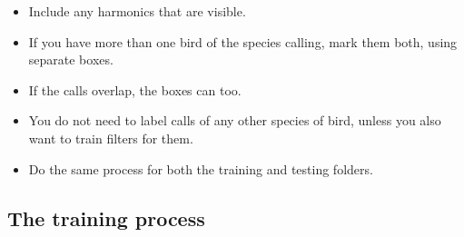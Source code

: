 \documentclass{article}
\begin{document}
\begin{description}
\begin{itemize}
\item Include any harmonics that are visible. 
\item If you have more than one bird of the species calling, mark them both, using separate boxes. 
\item If the calls overlap, the boxes can too. 
\item You do not need to label calls of any other species of bird, unless you also want to train filters for them. 
\item Do the same process for both the training and testing folders.
\end{itemize}
\end{description}

\subsection{The training process}
\end{document}
